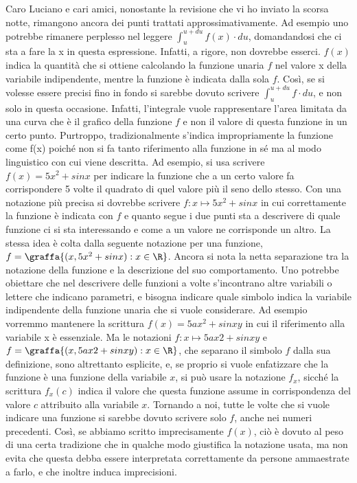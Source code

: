 Caro Luciano e cari amici,
       nonostante la revisione che vi ho inviato la scorsa notte, rimangono 
ancora dei punti trattati ap­prossimativamente. Ad esempio uno potrebbe 
rimanere perplesso nel leggere \(\int_u^{u+du} f(x) \cdot du\), 
doman­dandosi che ci sta a 
fare la x in questa espressione. Infatti, a rigore, non dovrebbe esserci. 
\(f(x)\) indica la quantità che si ottiene calcolando la funzione unaria \(f\) 
nel 
valore x della variabile indipendente, mentre la funzione è indicata dalla 
sola \(f\). Così, se si volesse essere precisi fino in fondo si sarebbe 
dovuto 
scrivere \(\int_u^{u+du} f \cdot du\), e non solo in questa occasione. 
Infatti, l'integrale 
vuole rappresentare l'area limitata da una curva che è il grafico della 
funzione \(f\) e non il valore di questa funzione in un certo punto. 
Purtroppo, 
tradizionalmente s'indica impropriamente la funzione come f(x) poiché non si 
fa tanto riferimento alla funzione in sé ma al modo linguistico con cui viene 
descritta. Ad esempio, si usa scrivere \(f(x) = 5x^2+sin x\) per indicare la 
funzione che a un certo valore fa corrispondere 5 volte il quadrato di quel 
valore più il seno dello stesso. Con una notazione più precisa si dovrebbe 
scrivere \(f: x \mapsto 5x^2+sin x\) in cui correttamente la funzione è 
indicata con \(f\) 
e quanto segue i due punti sta a descrivere di quale funzione ci si sta 
interessando e come a un valore ne corrisponde un altro. La stessa idea è 
colta dalla seguente notazione per una funzione, 
\(f = \graffa{(x, 5x^2+sin x): x \in \R}\). 
Ancora si nota la netta separazione tra la notazione della funzione e la 
descrizione del suo comportamento. Uno potrebbe obiettare che nel descrivere 
delle funzioni a volte s'incontrano altre variabili o lettere che indicano 
parametri, e bisogna indicare quale simbolo indica la variabile indipendente 
della funzione unaria che si vuole considerare. Ad esempio vorremmo mantenere 
la scrittura \(f(x) = 5ax^2+sin xy\) in cui il riferimento alla variabile x è 
essenziale. Ma le notazioni 
\(f: x \mapsto 5ax2+sin xy\) e 
\(f=\graffa{(x, 5ax2+sin xy): x \in \R}\), 
che separano il simbolo \(f\) dalla sua definizione, sono altrettanto 
esplicite, 
e, se proprio si vuole enfatizzare che la funzione è una funzione della 
variabile \(x\), si può usare la notazione 
\(f_x\), sicché la scrittura \(f_x(c)\) 
indica il valore che questa funzione assume in corrispondenza del valore 
\(c\) attribuito alla variabile \(x\).
Tornando a noi, tutte le volte che si vuole indicare una funzione si sarebbe 
dovuto scrivere solo \(f\), anche nei numeri precedenti. Così, se abbiamo 
scritto 
imprecisamente \(f(x)\), ciò è dovuto al peso di una certa tradizione che in 
qualche modo giustifica la notazione usata, ma non evita che questa debba 
essere interpretata correttamente da persone ammaestrate a farlo, e che 
inoltre induca imprecisioni. 

